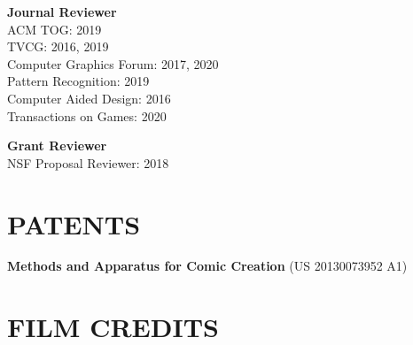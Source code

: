 \documentclass[line,margin]{res}
\begin{document}
\begin{resume}
\textbf{Journal Reviewer}\\
ACM TOG: 2019\\
TVCG: 2016, 2019\\
Computer Graphics Forum: 2017, 2020\\
Pattern Recognition: 2019\\
Computer Aided Design: 2016\\
Transactions on Games: 2020

\textbf{Grant Reviewer}\\
NSF Proposal Reviewer: 2018








\section{PATENTS}

\newcommand{\patent}[2] {
	\textbf{#1} (#2)
}

\patent
{Methods and Apparatus for Comic Creation}
{US 20130073952 A1}


\section{FILM CREDITS}

\newcommand{\filmcred}[4] {
	\textbf{#1} \hfill #2
	\\
	#3
	\\
	\emph{#4}
}


\end{resume}
\end{document}
